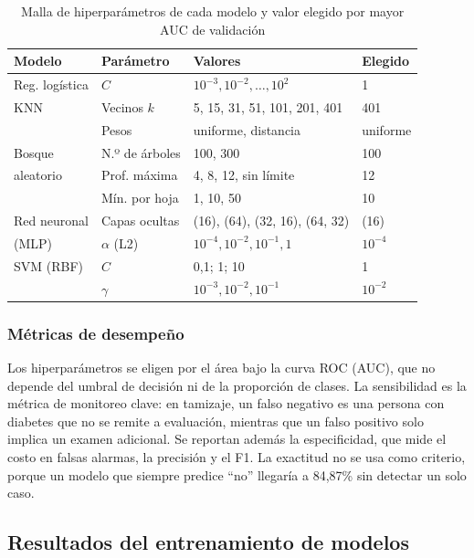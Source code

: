 \begin{table}[!t]
\centering
\caption{Malla de hiperparámetros de cada modelo y valor elegido por mayor AUC de validación}
\label{tab:malla}
\footnotesize
\setlength{\tabcolsep}{3pt}
\begin{tabular}{@{}p{1.75cm}p{1.9cm}p{3.25cm}p{1.1cm}@{}}
\toprule
\textbf{Modelo} & \textbf{Parámetro} & \textbf{Valores} & \textbf{Elegido} \\
\midrule
Reg. logística & $C$ & $10^{-3}, 10^{-2}, \ldots, 10^{2}$ & 1 \\
\addlinespace
KNN & Vecinos $k$ & 5, 15, 31, 51, 101, 201, 401 & 401 \\
 & Pesos & uniforme, distancia & uniforme \\
\addlinespace
Bosque & N.º de árboles & 100, 300 & 100 \\
aleatorio & Prof. máxima & 4, 8, 12, sin límite & 12 \\
 & Mín. por hoja & 1, 10, 50 & 10 \\
\addlinespace
Red neuronal & Capas ocultas & (16), (64), (32, 16), (64, 32) & (16) \\
(MLP) & $\alpha$ (L2) & $10^{-4}, 10^{-2}, 10^{-1}, 1$ & $10^{-4}$ \\
\addlinespace
SVM (RBF) & $C$ & 0,1; 1; 10 & 1 \\
 & $\gamma$ & $10^{-3}, 10^{-2}, 10^{-1}$ & $10^{-2}$ \\
\bottomrule
\end{tabular}
\end{table}

\subsubsection{Métricas de desempeño}
Los hiperparámetros se eligen por el área bajo la curva ROC (AUC), que no depende del umbral de decisión ni de la proporción de clases. La sensibilidad es la métrica de monitoreo clave: en tamizaje, un falso negativo es una persona con diabetes que no se remite a evaluación, mientras que un falso positivo solo implica un examen adicional. Se reportan además la especificidad, que mide el costo en falsas alarmas, la precisión y el F1. La exactitud no se usa como criterio, porque un modelo que siempre predice ``no'' llegaría a 84,87\% sin detectar un solo caso.

\subsection{Resultados del entrenamiento de modelos}

